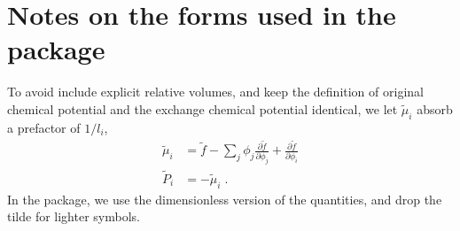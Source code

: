 \documentclass[reprint,onecolumn,groupedaddress,amsmath,amssymb]{revtex4-2}
\begin{document}
\section{Notes on the forms used in the package}

To avoid include explicit relative volumes, and keep the definition of original chemical potential and the exchange chemical potential identical, we let $\tilde{\mu}_i$ absorb a prefactor of $1/l_i$, 
\begin{subequations}
    \begin{align}
        \tilde{\mu}_i &=  \tilde{f} - \sum_j \phi_j \frac{\partial \tilde{f}}{\partial \phi_j} + \frac{\partial \tilde{f}}{\partial \phi_i} \\
        \tilde{P}_i &= - \tilde{\mu}_i \;.
    \end{align}
\end{subequations} 
In the package, we use the dimensionless version of the quantities, and drop the tilde for lighter symbols.
\end{document}

